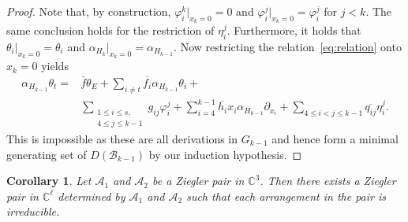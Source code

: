 \documentclass[a4paper,11pt]{amsart}
\def\CC{{\mathbb{C}}}%
\def\C{{\mathbb{C}}}%
\def\A{{\mathcal{A}}}%
\def\B{{\mathcal{B}}}%
\def\C{{\mathcal{C}}}%
\numberwithin{equation}{section}
\newtheorem{cor}[theorem]{Corollary}
\theoremstyle{remark}
\begin{document}
\begin{proof}
Note that, by construction, $\varphi_i^k|_{x_k=0}=0$  and $\varphi_i^j|_{x_k=0}=\varphi_i^j$ for $j<k$.
The same conclusion holds for the restriction of $\eta_i^j$.
 Furthermore, it holds that $\theta_i|_{x_k=0}=\theta_i$ and $\alpha_{H_k}|_{x_k=0}=\alpha_{H_{k-1}}$.
 Now restricting the relation~\eqref{eq:relation} onto $x_k=0$ yields
 \begin{align*}
 		\alpha_{H_{k-1}}\theta_t=&\overline{f} \theta_E+\sum_{i\neq t} \overline{f_i} \alpha_{H_{k-1}} \theta_i+\\
 	&\sum_{\substack{1\le i \le s, \\4\le j \le k-1}}g_{ij} \varphi_i^j+\sum_{i=4}^{k-1} \overline{h_{i}} x_i\alpha_{H_{k-1}} \partial_{x_i}+
 	\sum_{4\le i < j \le k-1} \overline{q_{ij}}\eta_i^j.
 \end{align*}
 This is impossible as these are all derivations in $G_{k-1}$ and hence form a minimal generating set of $D(\B_{k-1})$ by our induction hypothesis.
\end{proof}

\begin{cor}
\label{mainT}
	Let $\A_1$ and $\A_2$ be a Ziegler pair in $\CC^3$. Then there exists a Ziegler pair in $\CC^\ell$ determined by $\A_{1}$ and $\A_2$ such that each arrangement in the pair is irreducible.
	\label{highZiegler}
\end{cor}
\end{document}
